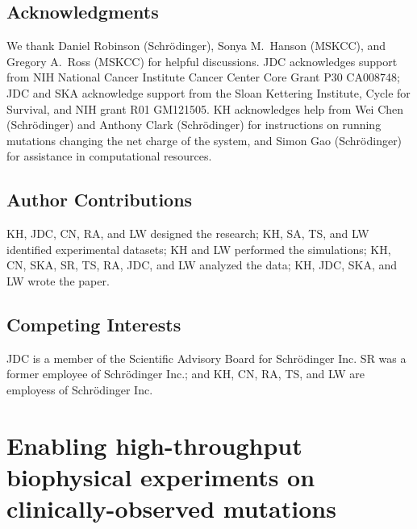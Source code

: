 \documentclass[phd,tocprelim]{cornell}
\begin{document}
\section{Acknowledgments}
We thank Daniel Robinson (Schr\"{o}dinger), Sonya M.\ Hanson (MSKCC), and Gregory A.\ Ross (MSKCC) for helpful discussions.
JDC acknowledges support from NIH National Cancer Institute Cancer Center Core Grant P30 CA008748; JDC and SKA acknowledge support from the Sloan Kettering Institute, Cycle for Survival, and NIH grant R01 GM121505.
KH acknowledges help from Wei Chen (Schr\"{o}dinger) and Anthony Clark (Schr\"{o}dinger) for instructions on running mutations changing the net charge of the system, and Simon Gao (Schr\"{o}dinger) for assistance in computational resources.

\section{Author Contributions}
KH, JDC, CN, RA, and LW designed the research; 
KH, SA, TS, and LW identified experimental datasets; 
KH and LW performed the simulations; 
KH, CN, SKA, SR, TS, RA, JDC, and LW analyzed the data; 
KH, JDC, SKA, and LW wrote the paper.

\section{Competing Interests}
JDC is a member of the Scientific Advisory Board for Schr\"{o}dinger Inc. SR was a former employee of Schr\"{o}dinger Inc.; and KH, CN, RA, TS, and LW are employess of Schr\"{o}dinger Inc.


\chapter{Enabling high-throughput biophysical experiments on clinically-observed mutations}
\end{document}
